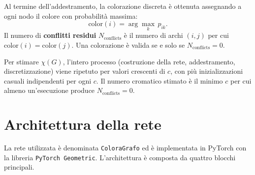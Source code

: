 \documentclass{article}
\begin{document}
Al termine dell'addestramento, la colorazione discreta è ottenuta assegnando a ogni nodo
il colore con probabilità massima:
\begin{equation}
    \mathrm{color}(i) = \arg\max_k\, p_{ik}.
\end{equation}
Il numero di \textbf{conflitti residui} $N_{\mathrm{conflicts}}$ è il numero di archi
$(i,j)$ per cui $\mathrm{color}(i) = \mathrm{color}(j)$. Una colorazione è valida se e
solo se $N_{\mathrm{conflicts}} = 0$.

Per stimare $\chi(G)$, l'intero processo (costruzione della rete, addestramento,
discretizzazione) viene ripetuto per valori crescenti di $c$, con più inizializzazioni
casuali indipendenti per ogni $c$. Il numero cromatico stimato è il minimo $c$ per cui
almeno un'esecuzione produce $N_{\mathrm{conflicts}} = 0$.

\section{Architettura della rete}

La rete utilizzata è denominata \texttt{ColoraGrafo} ed è implementata in PyTorch con la
libreria \texttt{PyTorch Geometric}. L'architettura è composta da quattro blocchi
principali.
\end{document}
